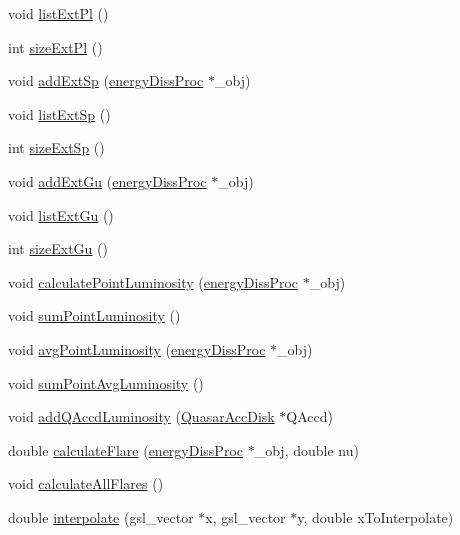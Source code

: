 \begin{DoxyCompactItemize}
\item 
void \hyperlink{classobserver_a86d811d98a5273c8e97444a2ac6606a1}{list\-Ext\-Pl} ()
\item 
int \hyperlink{classobserver_aa8290de1b8b9345c889ded609c7cd2d1}{size\-Ext\-Pl} ()
\item 
void \hyperlink{classobserver_a29d26dd051772217e0ca16b051ecd93f}{add\-Ext\-Sp} (\hyperlink{classenergyDissProc}{energy\-Diss\-Proc} $\ast$\-\_\-obj)
\item 
void \hyperlink{classobserver_aabb0a1a3fefbdb04844ae3555b13d038}{list\-Ext\-Sp} ()
\item 
int \hyperlink{classobserver_af0d03462bd4a837269c12d69f6b9199e}{size\-Ext\-Sp} ()
\item 
void \hyperlink{classobserver_a5f8d7efc385940222eb28d33378558b1}{add\-Ext\-Gu} (\hyperlink{classenergyDissProc}{energy\-Diss\-Proc} $\ast$\-\_\-obj)
\item 
void \hyperlink{classobserver_a06bd3a882a44a4bb4120aa18163a50f2}{list\-Ext\-Gu} ()
\item 
int \hyperlink{classobserver_ae0bf73a28d20debaa0066e4fbbac4395}{size\-Ext\-Gu} ()
\item 
void \hyperlink{classobserver_a341825cd835514e888203ffcf15ca5e6}{calculate\-Point\-Luminosity} (\hyperlink{classenergyDissProc}{energy\-Diss\-Proc} $\ast$\-\_\-obj)
\item 
void \hyperlink{classobserver_a2cdb4ba6523c5dbd3cb8383d4430a02f}{sum\-Point\-Luminosity} ()
\item 
void \hyperlink{classobserver_a78441d4287eb3e3991bfd8b19b74ef6e}{avg\-Point\-Luminosity} (\hyperlink{classenergyDissProc}{energy\-Diss\-Proc} $\ast$\-\_\-obj)
\item 
void \hyperlink{classobserver_a1906c04333220b8b121eda23e838fe63}{sum\-Point\-Avg\-Luminosity} ()
\item 
void \hyperlink{classobserver_ad34fc6b2013c4ce294c936c790747405}{add\-Q\-Accd\-Luminosity} (\hyperlink{classQuasarAccDisk}{Quasar\-Acc\-Disk} $\ast$Q\-Accd)
\item 
double \hyperlink{classobserver_a26080f0ca55ac7ae6f306bc11d18263d}{calculate\-Flare} (\hyperlink{classenergyDissProc}{energy\-Diss\-Proc} $\ast$\-\_\-obj, double nu)
\item 
void \hyperlink{classobserver_ade82015679a882a1052e6594dca46cb8}{calculate\-All\-Flares} ()
\item 
double \hyperlink{classobserver_af7fe35310b73997a7dab21cd6d4141db}{interpolate} (gsl\-\_\-vector $\ast$x, gsl\-\_\-vector $\ast$y, double x\-To\-Interpolate)

\end{DoxyCompactItemize}
